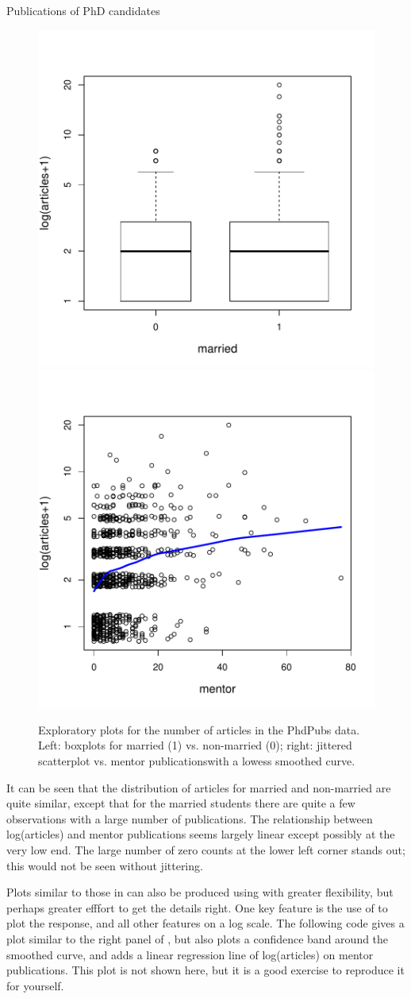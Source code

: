 \documentclass[11pt]{book}\usepackage[]{graphicx}\usepackage[]{color}
\newenvironment{knitrout}{}{} %
\renewenvironment{knitrout}{\small\renewcommand{\baselinestretch}{.85}}{} %
\begin{document}
\begin{Example}[phdpubs1]{Publications of PhD candidates}
\begin{knitrout}
\begin{figure}[!htbp]
\centerline{\includegraphics[width=.49\textwidth]{ch09/fig/phdpubs-logplots1} 
\includegraphics[width=.49\textwidth]{ch09/fig/phdpubs-logplots2} }

\caption[Exploratory plots for the number of articles in the PhdPubs data]{Exploratory plots for the number of articles in the PhdPubs data. Left: boxplots for married (1) vs. non-married (0); right: jittered scatterplot vs. mentor publicationswith a lowess smoothed curve.\label{fig:phdpubs-logplots}}
\end{figure}


\end{knitrout}
It can be seen that the distribution of articles for married and non-married are quite similar,
except that for the married students there are quite a few observations with a large number
of publications.  The relationship between log(articles) and mentor publications seems largely
linear except possibly at the very low end.  The large number of zero counts at the lower left
corner stands out; this would not be seen without jittering.

Plots similar to those in  can also be produced using 
with greater flexibility, but perhaps greater efffort to get the details right.
One key feature is the use of  to plot the response, and all other
features on a log scale.
The following code gives a plot similar to the right panel of
, but also plots a confidence band around the smoothed curve,
and adds a linear regression line of log(articles) on mentor publications.  This plot
is not shown here, but it is a good exercise to reproduce it for yourself.


\end{Example}
\end{document}
